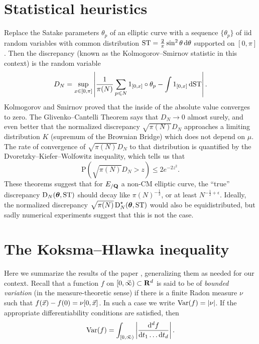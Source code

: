 \section{Statistical heuristics}

Replace the Satake parameters $\theta_p$ of an elliptic curve with 
a sequence $\{\theta_p\}$ of iid random variables with common distribution 
$\mathrm{ST} = \frac{2}{\pi} \sin^2 \theta\, \mathrm{d}\theta$ supported on $[0,\pi]$. Then 
the discrepancy (known as the Kolmogorov--Smirnov statistic in this context) is 
the random variable 
\[
	D_N = \sup_{x\in [0,\pi]} \left|\frac{1}{\pi(N)} \sum_{p\leqslant N} 1_{[0,x]}\circ \theta_p - \int 1_{[0,x]}\, \mathrm{d}\mathrm{ST}\right| .
\]
Kolmogorov and Smirnov proved that the inside of the absolute value converges 
to zero. The Glivenko--Cantelli Theorem says that $D_N \to 0$ almost surely, 
and even better that the normalized discrepancy $\sqrt{\pi(N)} D_N$ approaches 
a limiting distribution $K$ (supremum of the Brownian Bridge) which does not 
depend on $\mu$. The rate of convergence of $\sqrt{\pi(N)} D_N$ to that 
distribution is quantified by the Dvoretzky--Kiefer--Wolfowitz inequality, 
which tells us that 
\[
	\mathrm{P}\left(\sqrt{\pi(N)} D_N > z\right) \leqslant 2 e^{-2 z^2} .
\]
These theorems suggest that for $E_{/\mathbf{Q}}$ a non-CM elliptic 
curve, the ``true'' discrepancy $\operatorname{D}_N({\boldsymbol\theta},\mathrm{ST})$ should decay 
like $\pi(N)^{-\frac 1 2}$, or at least $N^{-\frac 1 2+\epsilon}$. 
Ideally, the normalized discrepancy $\sqrt{\pi(N)}\operatorname{D}_N^\star({\boldsymbol\theta},\mathrm{ST})$ 
would also be equidistributed, but sadly numerical experiments suggest that 
this is not the case. 





\section{The Koksma--Hlawka inequality}

Here we summarize the results of the paper \cite{okten-1999}, generalizing them 
as needed for our context. Recall that a function $f$ on 
$[0,\vec{\infty})\subset \mathbf{R}^d$ is said to be of \emph{bounded variation} (in the 
measure-theoretic sense) if there is a finite Radon measure $\nu$ such that 
$f(\vec{x}) - f(0) = \nu[0,\vec{x}]$. In such a case we write $\operatorname{Var}(f) = |\nu|$. If 
the appropriate differentiability conditions are satisfied, then 
\[
	\operatorname{Var}(f) = \int_{[0,\vec{\infty})} \left|\frac{\mathrm{d}^d f}{\mathrm{d} t_1 \dots \mathrm{d} t_d} \right|.
\]

